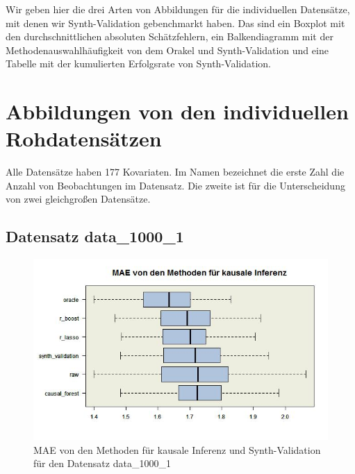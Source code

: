 \documentclass[12pt,a4paper,twoside]{scrartcl}
\numberwithin{equation}{section}
\newcounter{mypagecount}%
\newenvironment{interlude}{%
  \clearpage
  \setcounter{mypagecount}{\value{page}}%
  \thispagestyle{empty}%
  \pagestyle{empty}%
}{%
  \clearpage
  \setcounter{page}{\value{mypagecount}}%
}
\let\chapter=\section %
\begin{document}
\begin{interlude}
  
\begin{appendices}
  \label{anhang}
\noindent 
Wir geben hier die drei Arten von Abbildungen für die individuellen Datensätze, mit denen wir Synth-Validation gebenchmarkt haben. Das sind ein Boxplot mit den durchschnittlichen absoluten Schätzfehlern, ein Balkendiagramm mit der Methodenauswahlhäufigkeit von dem Orakel und Synth-Validation und eine Tabelle mit der kumulierten Erfolgsrate von Synth-Validation.\par

\chapter{Abbildungen von den individuellen Rohdatensätzen}\label{app:a}
\noindent 
Alle Datensätze haben 177 Kovariaten. Im Namen bezeichnet die erste Zahl die Anzahl von Beobachtungen im Datensatz. Die zweite ist für die Unterscheidung von zwei gleichgroßen Datensätze.\par

\subsection{Datensatz data\_1000\_1}

\begin{center}
\begin{figure}[H]
    \centering
    \includegraphics[height=0.5\textwidth, width=1\textwidth]{figures/plots/appendix/rawData1000aBoxplot.jpeg}
    \caption[MAE von den Methoden für kausale Inferenz und Synth-Validation für den Datensatz data\_1000\_1]{MAE von den Methoden für kausale Inferenz und Synth-Validation für den Datensatz data\_1000\_1}
  \end{figure}
\end{center}


\end{appendices}
\end{interlude}
\end{document}
